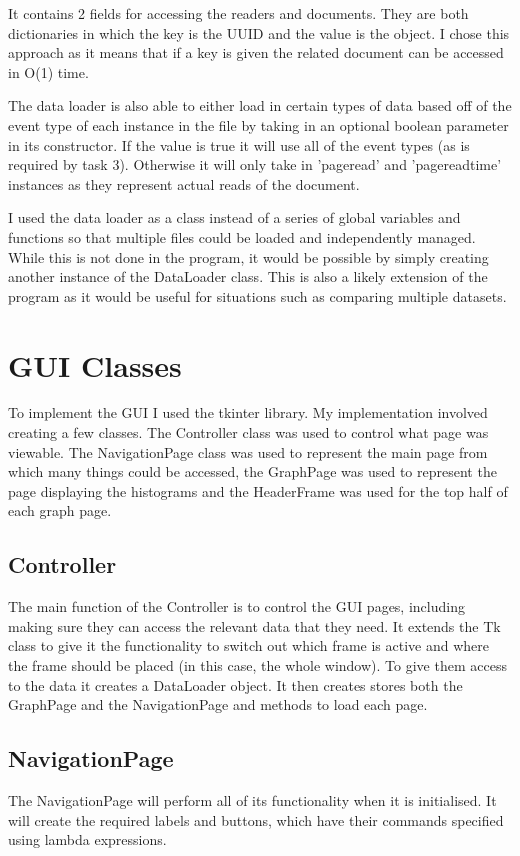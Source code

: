 \documentclass[11pt]{report}
\begin{document}
It contains 2 fields for accessing the readers and documents.  They are both dictionaries in which the key is the UUID and the value is the object.  I chose this approach as it means that if a key is given the related document can be accessed in O(1) time.

The data loader is also able to either load in certain types of data based off of the event type of each instance in the file by taking in an optional boolean parameter in its constructor.  If the value is true it will use all of the event types (as is required by task 3).  Otherwise it will only take in 'pageread' and 'pagereadtime' instances as they represent actual reads of the document.

I used the data loader as a class instead of a series of global variables and functions so that multiple files could be loaded and independently managed.  While this is not done in the program, it would be possible by simply creating another instance of the DataLoader class.  This is also a likely extension of the program as it would be useful for situations such as comparing multiple datasets.

\section{GUI Classes}
To implement the GUI I used the tkinter library.  My implementation involved creating a few classes.  The Controller class was used to control what page was viewable.  The NavigationPage class was used to represent the main page from which many things could be accessed, the GraphPage was used to represent the page displaying the histograms and the HeaderFrame was used for the top half of each graph page.

\subsection{Controller}
The main function of the Controller is to control the GUI pages, including making sure they can access the relevant data that they need.  It extends the Tk class to give it the functionality to switch out which frame is active and where the frame should be placed (in this case, the whole window).  To give them access to the data it creates a DataLoader object.  It then creates stores both the GraphPage and the NavigationPage and methods to load each page.  

\subsection{NavigationPage}
The NavigationPage will perform all of its functionality when it is initialised.  It will create the required labels and buttons, which have their commands specified using lambda expressions.
\end{document}
